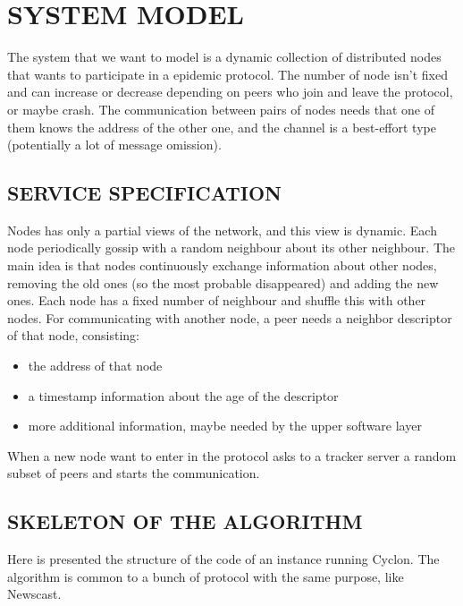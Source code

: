 \documentclass[a4paper,12pt,notitlepage]{article} %
\begin{document}
\section{SYSTEM MODEL}

The system that we want to model is a dynamic collection of distributed nodes that wants to participate in
 a epidemic protocol. The number of node isn't fixed and can increase or decrease depending on peers who
 join and leave the protocol, or maybe crash. 
 The communication between pairs of nodes needs that one 
 of them knows the address of the other one, and the channel is a best-effort type (potentially a lot of 
 message omission). 


\subsection{SERVICE SPECIFICATION}

Nodes has only a partial views of the network, and this view is dynamic. Each node periodically 
 gossip with a random neighbour about its other neighbour. The main idea is that nodes continuously
 exchange information about other nodes, removing the old ones (so the most probable disappeared) and
 adding the new ones. Each node has a fixed number of neighbour and shuffle this with other nodes.
 For communicating with another node, a peer needs a neighbor descriptor of that node, consisting:

 \begin{itemize}
 	\item the address of that node
 	\item a timestamp information about the age of the descriptor
 	\item more additional information, maybe needed by the upper software layer\cite{slideMontre}
 \end{itemize}

When a new node want to enter in the protocol asks to a tracker 
 server a random subset of peers and starts the communication.

 \subsection{SKELETON OF THE ALGORITHM}	
Here is presented the structure of the code of an instance running Cyclon. The algorithm
 is common to a bunch of protocol with the same purpose, like Newscast\cite{newscast}.
\end{document}
